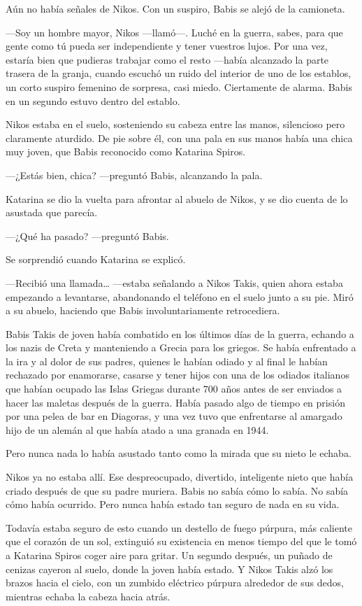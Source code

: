 Aún no había señales de Nikos. Con un suspiro, Babis se alejó de la
camioneta.

---Soy un hombre mayor, Nikos ---llamó---. Luché en la guerra, sabes,
para que gente como tú pueda ser independiente y tener vuestros lujos.
Por una vez, estaría bien que pudieras trabajar como el resto ---había
alcanzado la parte trasera de la granja, cuando escuchó un ruido del
interior de uno de los establos, un corto suspiro femenino de sorpresa,
casi miedo. Ciertamente de alarma. Babis en un segundo estuvo dentro del
establo.

Nikos estaba en el suelo, sosteniendo su cabeza entre las manos,
silencioso pero claramente aturdido. De pie sobre él, con una pala en
sus manos había una chica muy joven, que Babis reconocido como Katarina
Spiros.

---¿Estás bien, chica? ---preguntó Babis, alcanzando la pala.

Katarina se dio la vuelta para afrontar al abuelo de Nikos, y se dio
cuenta de lo asustada que parecía.

---¿Qué ha pasado? ---preguntó Babis.

Se sorprendió cuando Katarina se explicó.

---Recibió una llamada\ldots{} ---estaba señalando a Nikos Takis, quien
ahora estaba empezando a levantarse, abandonando el teléfono en el suelo
junto a su pie. Miró a su abuelo, haciendo que Babis involuntariamente
retrocediera.

Babis Takis de joven había combatido en los últimos días de la guerra,
echando a los nazis de Creta y manteniendo a Grecia para los griegos. Se
había enfrentado a la ira y al dolor de sus padres, quienes le habían
odiado y al final le habían rechazado por enamorarse, casarse y tener
hijos con una de los odiados italianos que habían ocupado las Islas
Griegas durante 700 años antes de ser enviados a hacer las maletas
después de la guerra. Había pasado algo de tiempo en prisión por una
pelea de bar en Diagoras, y una vez tuvo que enfrentarse al amargado
hijo de un alemán al que había atado a una granada en 1944.

Pero nunca nada lo había asustado tanto como la mirada que su nieto le
echaba.

Nikos ya no estaba allí. Ese despreocupado, divertido, inteligente nieto
que había criado después de que su padre muriera. Babis no sabía cómo lo
sabía. No sabía cómo había ocurrido. Pero nunca había estado tan seguro
de nada en su vida.

Todavía estaba seguro de esto cuando un destello de fuego púrpura, más
caliente que el corazón de un sol, extinguió su existencia en menos
tiempo del que le tomó a Katarina Spiros coger aire para gritar. Un
segundo después, un puñado de cenizas cayeron al suelo, donde la joven
había estado. Y Nikos Takis alzó los brazos hacia el cielo, con un
zumbido eléctrico púrpura alrededor de sus dedos, mientras echaba la
cabeza hacia atrás.


